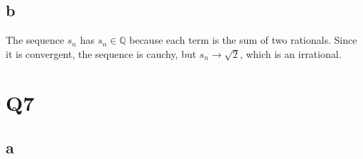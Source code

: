 \documentclass[12pt]{article}
\newcommand{\Q}{\mathbb{Q}}
\begin{document}
\subsection{b}
The sequence $s_n$ has $s_n \in \Q$ because each term is the sum of two rationals. Since it is convergent, the sequence is cauchy, but $s_n \to \sqrt 2$, which is an irrational.
\newpage


\section{Q7}
\subsection{a}
\end{document}
